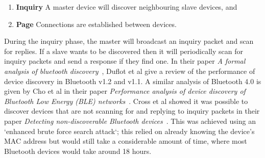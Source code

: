 \begin{enumerate}[noitemsep]
    \item \textbf{Inquiry} A master device will discover neighbouring slave devices, and
    \item \textbf{Page} Connections are established between devices.
\end{enumerate}

During the inquiry phase, the master will broadcast an inquiry packet and scan for replies. If a slave wants to be discovered then it will periodically scan for inquiry packets and send a response if they find one. In their paper \textit{A formal analysis of bluetooth discovery}~\cite{duflot_formal_2006}, Duflot et al give a review of the performance of device discovery in Bluetooth v1.2 and v1.1.
A similar analysis of Bluetooth 4.0 is given by Cho et al in their paper \textit{Performance analysis of device discovery of Bluetooth Low Energy (BLE) networks}~\cite{cho_performance_2016}.
\x
Cross et al showed it was possible to discover devices that are not scanning for and replying to inquiry packets in their paper \textit{Detecting non-discoverable Bluetooth devices}~\cite{goetz_detecting_2007}. This was achieved using an `enhanced brute force search attack`; this relied on already knowing the device's MAC address but would still take a considerable amount of time, where most Bluetooth devices would take around 18 hours. 
